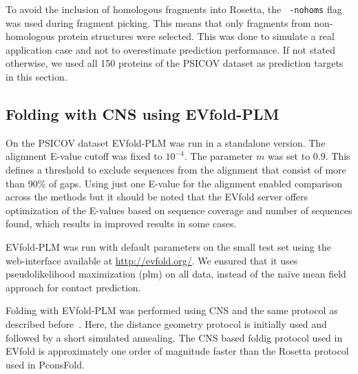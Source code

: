 \documentclass{bioinfo}
\begin{document}
\begin{methods}
To avoid the inclusion of homologous fragments into Rosetta, the {\tt
  -nohoms} flag was used during fragment
picking. This means that only fragments from non-homologous protein structures were selected. This
was done to simulate a real application case and not to overestimate
prediction performance. If not stated otherwise, we used all 150 proteins of
the PSICOV dataset as prediction targets in this section. 


\subsection{Folding with CNS using EVfold-PLM}
On the PSICOV dataset EVfold-PLM was run in a standalone version. The
alignment E-value cutoff was fixed to $10^{-4}$. The parameter $m$ was
set to 0.9. This defines a threshold to exclude sequences from the
alignment that consist of more than 90\% of gaps. Using just one E-value for the alignment  enabled comparison across the methods but it should be noted that the EVfold server offers optimization of the E-values based on sequence coverage and number of sequences found, which results in improved results in some cases. 

EVfold-PLM was run with default parameters on the small test set using
the web-interface available at \url{http://evfold.org/}. We ensured
that it uses pseudolikelihood maximization (plm) on all data, instead of the na\"ive mean field approach for contact prediction.

Folding with EVfold-PLM was performed using CNS and the same protocol
as described before~\cite[]{marks_protein_2011}. Here, the distance
geometry protocol is initially used and followed by a short simulated
annealing. The CNS based foldig protocol used in EVfold is approximately
one order of magnitude faster than the Rosetta protocol used in PconsFold.


\end{methods}
\end{document}
